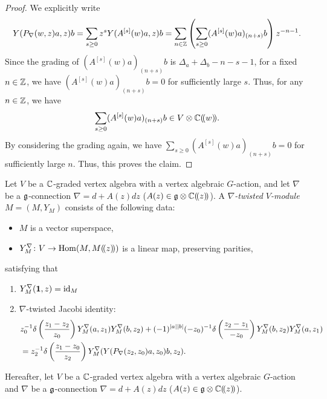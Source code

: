 \documentclass[final,reqno]{amsart}
\begin{document}
\begin{proof}
    We explicitly write 
    \[
        Y(P_{\nabla}(w,z)a,z)b=\sum_{s\geq 0}z^sY(A^{[s]}(w)a,z)b=\sum_{n\in\mathbb{Z}}\left(\sum_{s\geq 0}(A^{[s]}(w)a)_{(n+s)}b\right)z^{-n-1}.
    \]
     Since the grading of $(A^{[s]}(w)a)_{(n+s)}b$ is $\Delta_a+\Delta_b-n-s-1$, for a fixed $n\in\mathbb{Z}$, we have $(A^{[s]}(w)a)_{(n+s)}b=0$ for sufficiently large $s$. Thus, for any $n\in\mathbb{Z}$, we have
     \[
        \sum_{s\geq 0}(A^{[s]}(w)a)_{(n+s)}b\in V\otimes\mathbb{C}(\!( w )\!).
     \]
     By considering the grading again, we have $\sum_{s\geq 0}(A^{[s]}(w)a)_{(n+s)}b=0$ for sufficiently large $n$. Thus, this proves the claim.
\end{proof}

\begin{dfn}\label{dfn:conn tw mod}
    Let $V$ be a $\mathbb{C}$-graded vertex algebra with a vertex algebraic $G$-action, and let $\nabla$ be a $\mathfrak{g}$-connection $\nabla=d+A(z)dz$ ($A(z)\in\mathfrak{g}\otimes\mathbb{C}(\!( z )\!)$). A \emph{$\nabla$-twisted $V$-module} $M=(M,Y_M)$ consists of the following data:
    \begin{itemize}
    \item 
    $M$ is a vector superspace,
    \item 
    $Y^\nabla_M\colon V\to\operatorname{Hom}(M,M(\!( z )\!))$ is a linear map, preserving parities,
    \end{itemize}
    satisfying that
    \begin{enumerate}
    \item 
    $Y^\nabla_M(\mathbf{1},z)=\operatorname{id}_M$
    \item 
    $\nabla$-twisted Jacobi identity: 
    \begin{equation}\label{eq:nabla tw Jacobi}
        \begin{split}
            &z_0^{-1}\delta\left(\frac{z_1-z_2}{z_0}\right)Y^\nabla_M(a,z_1)Y^\nabla_M(b,z_2)+(-1)^{\left| a \right|\left| b \right|}(-z_0)^{-1}\delta\left(\frac{z_2-z_1}{-z_0}\right)Y^\nabla_M(b,z_2)Y^\nabla_M(a,z_1)\\
            &=z_2^{-1}\delta\left(\frac{z_1-z_0}{z_2}\right)Y^\nabla_M(Y(P_{\nabla}(z_2,z_0)a,z_0)b,z_2).
        \end{split}
    \end{equation}
    \end{enumerate}
\end{dfn}

Hereafter, let $V$ be a $\mathbb{C}$-graded vertex algebra with a vertex algebraic $G$-action and $\nabla$ be a $\mathfrak{g}$-connection $\nabla=d+A(z)dz$ ($A(z)\in\mathfrak{g}\otimes\mathbb{C}(\!( z )\!)$).
\end{document}
